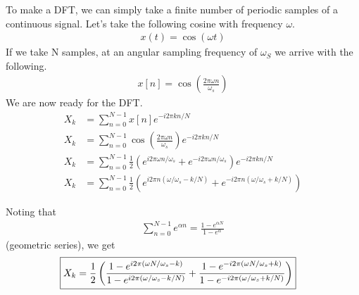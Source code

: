 \documentclass[twocolumn]{myarticle}
\begin{document}
To make a DFT, we can simply take a finite number of periodic samples of a continuous signal. 
Let's take the following cosine with frequency $\omega$.
\begin{align}
    x(t)=\cos\left(\omega t\right)
\end{align}
If we take N samples, at an angular sampling frequency of $\omega_{S}$ we arrive with the following.
\begin{align}
    x[n]=\cos\left( \frac{2 \pi \omega n}{\omega_{s}}\right)
\end{align}
We are now ready for the DFT.
\begin{align}
    X_{k} &= \sum^{N-1}_{n=0}x[n]e^{-i 2\pi k n/N} 
    \\
    X_{k} &= \sum^{N-1}_{n=0}\cos\left(\frac{2 \pi \omega n}{\omega_{s}}\right) e^{-i 2\pi kn/N}
    \\
    X_{k} &= \sum^{N-1}_{n=0} \frac{1}{2} \left( e^{i 2 \pi \omega n / \omega_s} + e^{-i 2 \pi \omega n / \omega_s} \right) e^{-i 2\pi kn/N}
    \\
    X_{k} &= \sum^{N-1}_{n=0} \frac{1}{2} \left( e^{i 2 \pi n (\omega/\omega_s - k/N)} + e^{-i 2 \pi n (\omega / \omega_s + k/N)} \right)
\end{align}

Noting that
\begin{align}
    \sum_{n=0}^{N-1}e^{\alpha n} = \frac{1-e^{\alpha N}}{1-e^{\alpha}}
\end{align}
(geometric series), we get
\begin{align}
    \Aboxed{X_{k} &= \frac{1}{2} \left( \frac{1 - e^{i 2 \pi (\omega N / \omega_s - k)}}{1 - e^{i 2 \pi (\omega / \omega_s - k/N)}} + \frac{1 - e^{-i 2 \pi (\omega N / \omega_s + k)}}{1 - e^{-i 2 \pi (\omega / \omega_s + k/N)}} \right)}
\end{align}
\end{document}
